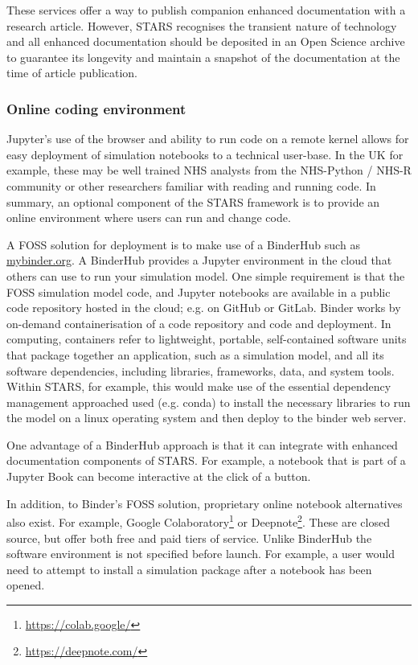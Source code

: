 \documentclass[]{interact}
\theoremstyle{plain}%
\theoremstyle{definition}
\theoremstyle{remark}
\begin{document}
These services offer a way to publish companion enhanced documentation with a research article. However, STARS recognises the transient nature of technology and all enhanced documentation should be deposited in an Open Science archive to guarantee its longevity and maintain a snapshot of the documentation at the time of article publication.   

\subsubsection{Online coding environment}

Jupyter's use of the browser and ability to run code on a remote kernel allows for easy deployment of simulation notebooks to a technical user-base. In the UK for example, these may be well trained NHS analysts from the NHS-Python / NHS-R community or other researchers familiar with reading and running code.  In summary, an optional component of the STARS framework is to provide an online environment where users can run and change code. 

A FOSS solution for deployment is to make use of a BinderHub such as \url{mybinder.org}. A BinderHub provides a Jupyter environment in the cloud that others can use to run your simulation model.  One simple requirement is that the FOSS simulation model code, and Jupyter notebooks are available in a public code repository hosted in the cloud; e.g. on GitHub or GitLab. Binder works by on-demand containerisation of a code repository and code and deployment. In computing, containers refer to lightweight, portable, self-contained software units that package together an application, such as a simulation model, and all its software dependencies, including libraries, frameworks, data, and system tools. Within STARS, for example, this would make use of the essential dependency management approached used (e.g. conda) to install the necessary libraries to run the model on a linux operating system and then deploy to the binder web server. 

One advantage of a BinderHub approach is that it can integrate with enhanced documentation components of STARS.  For example, a notebook that is part of a Jupyter Book can become interactive at the click of a button. 

In addition, to Binder's FOSS solution, proprietary online notebook alternatives also exist. For example, Google Colaboratory\footnote{\url{https://colab.google/}} or Deepnote\footnote{\url{https://deepnote.com/}}.  These are closed source, but offer both free and paid tiers of service.  Unlike BinderHub the software environment is not specified before launch.  For example, a user would need to attempt to install a simulation package after a notebook has been opened.
\end{document}
